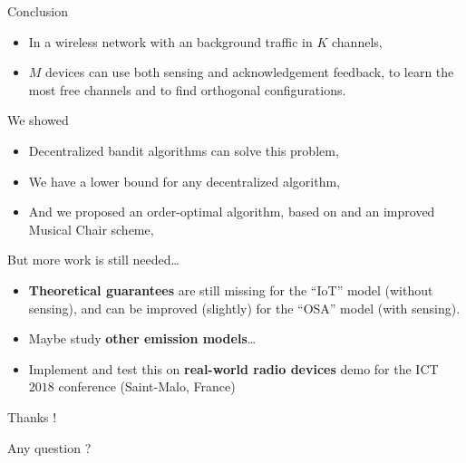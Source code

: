 \documentclass[12pt,english,ignorenonframetext,aspectratio=169,]{beamer}
\newcommand{\Fontify}{}
\providecommand{\tightlist}{%
  \setlength{\itemsep}{0pt}\setlength{\parskip}{0pt}}
\begin{document}
\begin{frame}[allowframebreaks]{Conclusion}

\begin{itemize}
\tightlist
\item
  In a wireless network with an \iid{} background traffic in \(K\)
  channels,
\item
  \(M\) devices can use both sensing and acknowledgement feedback, to
  learn the most free channels and to find orthogonal configurations.
\end{itemize}

\begin{block}{We showed $\;\;$ \Smiley[1.2]}

\begin{itemize}
\tightlist
\item
  Decentralized bandit algorithms can solve this problem,
\item
  We have a lower bound for any decentralized algorithm,
\item
  And we proposed an order-optimal algorithm, based on \klUCB{} and an
  improved Musical Chair scheme, \MCTopM
\end{itemize}

\end{block}

\begin{block}{But more work is still needed\ldots{} $\;\;$ \Sey[1.2]}

\begin{itemize}
\tightlist
\item
  \textbf{Theoretical guarantees} are still missing for the ``IoT''
  model (without sensing), and can be improved (slightly) for the
  ``OSA'' model (with sensing).
\item
  Maybe study \textbf{other emission models}\ldots{}
\item
  Implement and test this on \textbf{real-world radio devices}
  \hook demo for the ICT \(2018\) conference (Saint-Malo, France)
\end{itemize}

\end{block}

\vspace*{10pt}

\begin{center}\begin{LARGE}
  {\Fontify Thanks !}
  \Smiley[0.9]

  {\Fontify Any question ?}
\end{LARGE}\end{center}

\end{frame}
\end{document}

